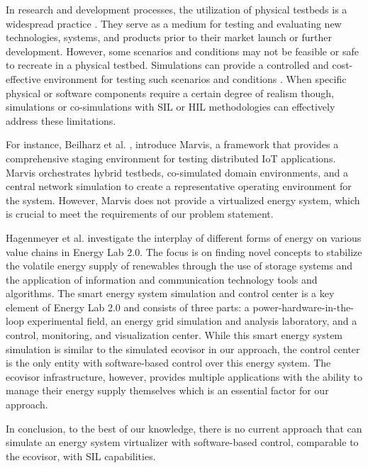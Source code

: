 In research and development processes, the utilization of physical testbeds is a
widespread practice \cite{cintuglu2017, mambretti2015}. They serve as a medium
for testing and evaluating new technologies, systems, and products prior to
their market launch or further development. However, some scenarios and
conditions may not be feasible or safe to recreate in a physical testbed.
Simulations can provide a controlled and cost-effective environment for testing
such scenarios and conditions \cite{mansouri2020}. When specific physical or
software components require a certain degree of realism though, simulations or
co-simulations with SIL or HIL methodologies can effectively address these
limitations.

For instance, Beilharz et al. \cite{beilharz2021}, introduce Marvis, a framework
that provides a comprehensive staging environment for testing distributed IoT
applications. Marvis orchestrates hybrid testbeds, co-simulated domain
environments, and a central network simulation to create a representative
operating environment for the system. However, Marvis does not provide a
virtualized energy system, which is crucial to meet the requirements of our
problem statement.

Hagenmeyer et al. \cite{hagenmeyer2016} investigate the interplay of different
forms of energy on various value chains in Energy Lab 2.0. The focus is on
finding novel concepts to stabilize the volatile energy supply of renewables
through the use of storage systems and the application of information and
communication technology tools and algorithms. The smart energy system
simulation and control center is a key element of Energy Lab 2.0 and consists of
three parts: a power-hardware-in-the-loop experimental field, an energy grid
simulation and analysis laboratory, and a control, monitoring, and visualization
center. While this smart energy system simulation is similar to the simulated
ecovisor in our approach, the control center is the only entity with
software-based control over this energy system. The ecovisor infrastructure,
however, provides multiple applications with the ability to manage their energy
supply themselves which is an essential factor for our approach.

In conclusion, to the best of our knowledge, there is no current approach that
can simulate an energy system virtualizer with software-based control,
comparable to the ecovisor, with SIL capabilities.
